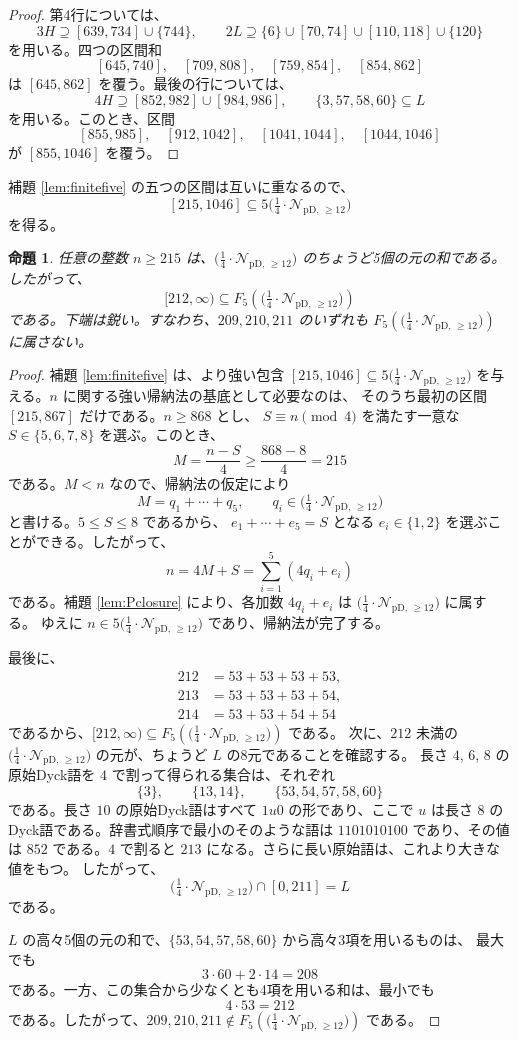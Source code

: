 \documentclass[12pt]{ltjsarticle}
\theoremstyle{plain}
\newtheorem{proposition}[theorem]{命題}
\newcommand{\Pset}{\bigl(\tfrac14\cdot
  \mathcal{N}_{\mathrm{pD},\,\geq12}\bigr)}
\begin{document}
\begin{proof}
第4行については、
\[
 3H\supseteq[639,734]\cup\{744\},\qquad
 2L\supseteq\{6\}\cup[70,74]\cup[110,118]\cup\{120\}
\]
を用いる。四つの区間和
\[
 [645,740],\quad[709,808],\quad[759,854],\quad[854,862]
\]
は $[645,862]$ を覆う。最後の行については、
\[
 4H\supseteq[852,982]\cup[984,986],
 \qquad \{3,57,58,60\}\subseteq L
\]
を用いる。このとき、区間
\[
 [855,985],\quad[912,1042],\quad[1041,1044],\quad[1044,1046]
\]
が $[855,1046]$ を覆う。
\end{proof}

補題 \ref{lem:finitefive} の五つの区間は互いに重なるので、
\[
 [215,1046]\subseteq5\Pset
\]
を得る。

\begin{proposition}\label{prop:fiveP}
任意の整数 $n\geq215$ は、$\Pset$ のちょうど5個の元の和である。したがって、
\[
 [212,\infty)\subseteq F_5(\Pset)
\]
である。下端は鋭い。すなわち、$209,210,211$ のいずれも
$F_5(\Pset)$ に属さない。
\end{proposition}

\begin{proof}
補題 \ref{lem:finitefive} は、より強い包含
$[215,1046]\subseteq5\Pset$ を与える。$n$ に関する強い帰納法の基底として必要なのは、
そのうち最初の区間 $[215,867]$ だけである。$n\geq868$ とし、
$S\equiv n\pmod4$ を満たす一意な $S\in\{5,6,7,8\}$ を選ぶ。このとき、
\[
 M=\frac{n-S}{4}\geq\frac{868-8}{4}=215
\]
である。$M<n$ なので、帰納法の仮定により
\[
 M=q_1+\cdots+q_5,\qquad q_i\in\Pset
\]
と書ける。$5\leq S\leq8$ であるから、
$e_1+\cdots+e_5=S$ となる $e_i\in\{1,2\}$ を選ぶことができる。したがって、
\[
 n=4M+S=\sum_{i=1}^{5}(4q_i+e_i)
\]
である。補題 \ref{lem:Pclosure} により、各加数 $4q_i+e_i$ は $\Pset$ に属する。
ゆえに $n\in5\Pset$ であり、帰納法が完了する。

最後に、
\[
\begin{aligned}
212&=53+53+53+53,\\
213&=53+53+53+54,\\
214&=53+53+54+54
\end{aligned}
\]
であるから、$[212,\infty)\subseteq F_5(\Pset)$ である。
次に、$212$ 未満の $\Pset$ の元が、ちょうど $L$ の8元であることを確認する。
長さ $4$, $6$, $8$ の原始Dyck語を $4$ で割って得られる集合は、それぞれ
\[
 \{3\},\qquad \{13,14\},\qquad \{53,54,57,58,60\}
\]
である。長さ $10$ の原始Dyck語はすべて $1u0$ の形であり、ここで $u$ は長さ $8$ の
Dyck語である。辞書式順序で最小のそのような語は $1101010100$ であり、その値は
$852$ である。$4$ で割ると $213$ になる。さらに長い原始語は、これより大きな値をもつ。
したがって、
\[
 \Pset\cap[0,211]=L
\]
である。

$L$ の高々5個の元の和で、$\{53,54,57,58,60\}$ から高々3項を用いるものは、
最大でも
\[
 3\cdot60+2\cdot14=208
\]
である。一方、この集合から少なくとも4項を用いる和は、最小でも
\[
 4\cdot53=212
\]
である。したがって、$209,210,211\notin F_5(\Pset)$ である。
\end{proof}
\end{document}
